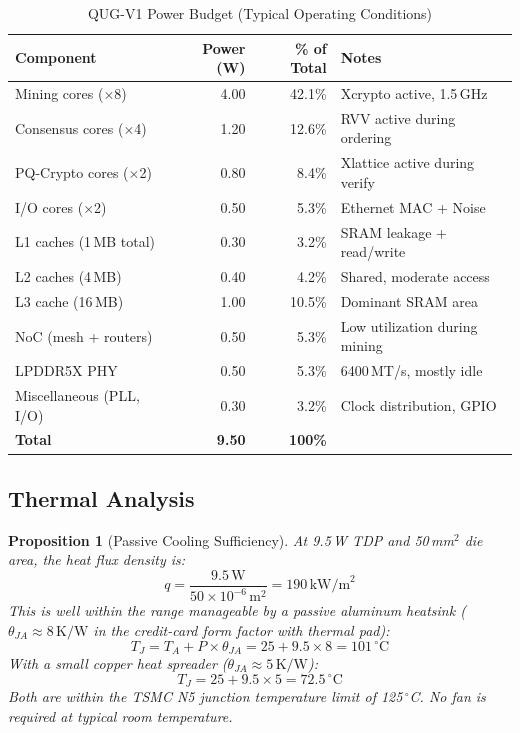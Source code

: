 \documentclass[11pt,a4paper]{article}
\newtheorem{proposition}[theorem]{Proposition}
\begin{document}
\begin{table}[H]
\centering
\caption{QUG-V1 Power Budget (Typical Operating Conditions)}
\label{tab:power}
\begin{tabular}{@{}lrrl@{}}
\toprule
\textbf{Component} & \textbf{Power (W)} & \textbf{\% of Total} & \textbf{Notes} \\
\midrule
Mining cores ($\times$8) & 4.00 & 42.1\% & Xcrypto active, 1.5\,GHz \\
Consensus cores ($\times$4) & 1.20 & 12.6\% & RVV active during ordering \\
PQ-Crypto cores ($\times$2) & 0.80 & 8.4\% & Xlattice active during verify \\
I/O cores ($\times$2) & 0.50 & 5.3\% & Ethernet MAC + Noise \\
L1 caches (1\,MB total) & 0.30 & 3.2\% & SRAM leakage + read/write \\
L2 caches (4\,MB) & 0.40 & 4.2\% & Shared, moderate access \\
L3 cache (16\,MB) & 1.00 & 10.5\% & Dominant SRAM area \\
NoC (mesh + routers) & 0.50 & 5.3\% & Low utilization during mining \\
LPDDR5X PHY & 0.50 & 5.3\% & 6400\,MT/s, mostly idle \\
Miscellaneous (PLL, I/O) & 0.30 & 3.2\% & Clock distribution, GPIO \\
\midrule
\textbf{Total} & \textbf{9.50} & \textbf{100\%} & \\
\bottomrule
\end{tabular}
\end{table}

\subsection{Thermal Analysis}

\begin{proposition}[Passive Cooling Sufficiency]
At 9.5\,W TDP and 50\,mm$^2$ die area, the heat flux density is:
\begin{equation}
    q = \frac{9.5\,\text{W}}{50 \times 10^{-6}\,\text{m}^2} = 190\,\text{kW/m}^2
\end{equation}
This is well within the range manageable by a passive aluminum heatsink ($\theta_{JA} \approx 8\,\text{K/W}$ in the credit-card form factor with thermal pad):
\begin{equation}
    T_J = T_A + P \times \theta_{JA} = 25 + 9.5 \times 8 = 101\,^\circ\text{C}
\end{equation}
With a small copper heat spreader ($\theta_{JA} \approx 5\,\text{K/W}$):
\begin{equation}
    T_J = 25 + 9.5 \times 5 = 72.5\,^\circ\text{C}
\end{equation}
Both are within the TSMC N5 junction temperature limit of 125$\,^\circ$C. No fan is required at typical room temperature.
\end{proposition}
\end{document}
